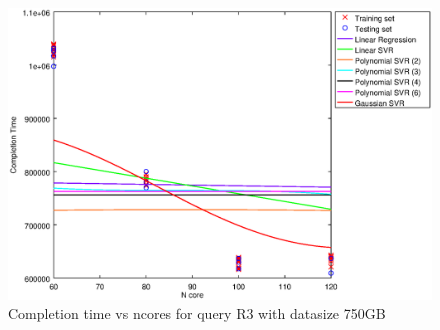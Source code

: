 
\begin {figure}[hbtp]
\centering
\includegraphics[width=\textwidth]{output/R3_750_LINEAR_NCORE/plot_R3_750.eps}
\caption{Completion time vs ncores for query R3 with datasize 750GB}
\label{fig:coreonly_linear_R3_750}
\end {figure}
